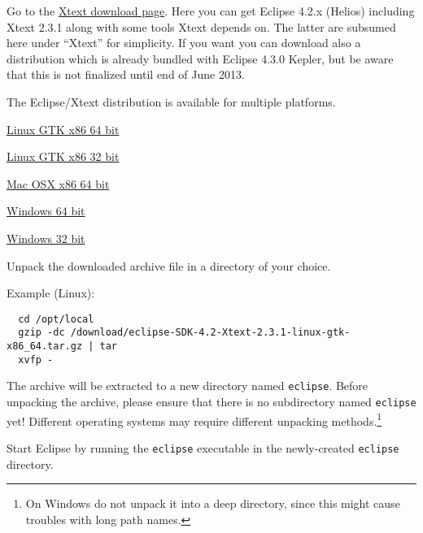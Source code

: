 \begin{compactenum}
    \item Go to the \href{http://download.itemis.com/distros/}{Xtext download
    page}. Here you can get Eclipse 4.2.x (Helios) including Xtext 2.3.1
    along with some tools Xtext depends on. The latter are subsumed here under
    ``Xtext'' for simplicity.
    If you want you can download also a distribution
    which is already bundled with Eclipse 4.3.0 Kepler, but be aware that this
    is not finalized until end of June 2013.
    \item The Eclipse/Xtext distribution is available for multiple platforms.

    \begin{compactenum}
      \item
      \href{http://download.itemis.com/distros/eclipse-SDK-4.2-Xtext-2.3.1-linux-gtk-x86_64.tar.gz}{Linux GTK x86 64 bit}
      \item
      \href{http://download.itemis.com/distros/eclipse-SDK-4.2-Xtext-2.3.1-linux-gtk.tar.gz}{Linux GTK x86 32 bit}
        \item
        \href{http://download.itemis.com/distros/eclipse-SDK-4.2-Xtext-2.3.1-macosx-cocoa-x86_64.tar.gz}{Mac OSX x86 64 bit}
        \item
        \href{http://download.itemis.com/distros/eclipse-SDK-4.2-Xtext-2.3.1-win32-x86_64.zip}{Windows 64 bit}
        \item
        \href{http://download.itemis.com/distros/eclipse-SDK-4.2-Xtext-2.3.1-win32.zip}{Windows 32 bit}
    \end{compactenum}

    \item Unpack the downloaded archive file in a directory of your choice.

        Example (Linux):

\begin{lstlisting}
  cd /opt/local
  gzip -dc /download/eclipse-SDK-4.2-Xtext-2.3.1-linux-gtk-x86_64.tar.gz | tar
  xvfp -
\end{lstlisting}

        The archive will be extracted to a new directory named \texttt{eclipse}. Before
        unpacking the archive, please ensure that there is no subdirectory named
        \texttt{eclipse} yet! Different operating systems may require different unpacking
        methods.\footnote{On Windows do not unpack it into a deep directory,
        since this might cause troubles with long path names.}

    \item Start Eclipse by running the \texttt{eclipse} executable in the newly-created
    \texttt{eclipse} directory.
\end{compactenum}
